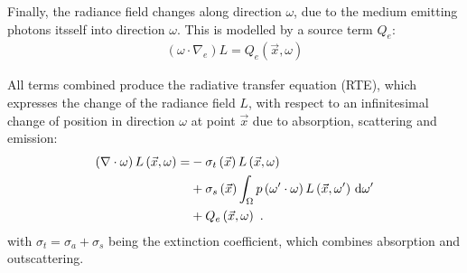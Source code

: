 
Finally, the radiance field changes along direction $\omega$, due to the medium emitting photons itsself into direction $\omega$. This is modelled by a source term $Q_e$:
\begin{align}
\left(\omega\cdot\nabla_{e}\right)L = Q_e\left(\vec{x}, \omega\right)
\end{align}

All terms combined produce the radiative transfer equation (RTE), which expresses the change of the radiance field $L$, with respect to an infinitesimal change of position in direction $\omega$ at point $\vec{x}$ due to absorption, scattering and emission:
\begin{align}
\left(\nabla\cdot\omega\right)L\left(\vec{x}, \omega \right)
=&
-\sigma_t\left(\vec{x}\right) L\left(\vec{x}, \omega \right)\nonumber\\
&
+\sigma_s\left(\vec{x}\right) \int_{\Omega}
{
p\left(\omega'\cdot\omega\right)L\left(\vec{x}, \omega' \right)\,\mathrm{d}\omega'
}
\label{eq:rte}
\\
&
+Q_e\left(\vec{x}, \omega\right)
\nonumber
\  .
\end{align}
with $\sigma_t=\sigma_a+\sigma_s$ being the extinction coefficient, which combines absorption and outscattering.

